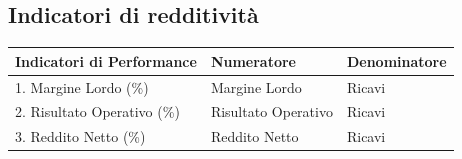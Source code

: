 \documentclass{article}
\renewcommand{\arraystretch}{1.5}
\begin{document}
\subsection{Indicatori di redditività}
\begin{center}
    \renewcommand{\arraystretch}{2}
    \begin{tabular}{|p{5cm}|p{5cm}|p{5cm}|}
        \hline 
        \textbf{Indicatori di Performance} & \textbf{Numeratore} & \textbf{Denominatore}\\
        \hline 
        1. Margine Lordo (\%) & Margine Lordo & Ricavi\\
        \hline 
        2. Risultato Operativo (\%) & Risultato Operativo & Ricavi\\
        \hline 
        3. Reddito Netto (\%) & Reddito Netto & Ricavi\\
        \hline 
    \end{tabular}
\end{center}
\end{document}
